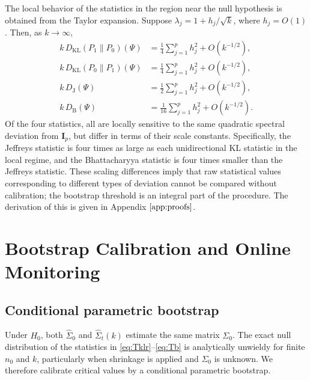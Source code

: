 \documentclass[11pt,a4paper]{article}
\newcommand{\I}{\mathbf{I}}
\newcommand{\KL}{\mathrm{KL}}
\newcommand{\J}{\mathrm{J}}
\newcommand{\Bhat}{\mathrm{B}}
\begin{document}
The local behavior of the statistics in the region near the null hypothesis is obtained from the Taylor
expansion. Suppose $\lambda_{j}=1+h_{j}/\sqrt{k}$, where $h_{j}=O(1)$. Then,
as $k\to\infty$,
\begin{align}
k\,D_{\KL}(P_{1}\|P_{0})(\Psi) &= \tfrac{1}{4}\textstyle\sum_{j=1}^{p} h_{j}^{2}+O(k^{-1/2}),
\label{eq:loc-klr}\\
k\,D_{\KL}(P_{0}\|P_{1})(\Psi) &= \tfrac{1}{4}\textstyle\sum_{j=1}^{p} h_{j}^{2}+O(k^{-1/2}),
\label{eq:loc-klf}\\
k\,D_{\J}(\Psi) &= \tfrac{1}{2}\textstyle\sum_{j=1}^{p} h_{j}^{2}+O(k^{-1/2}),
\label{eq:loc-j}\\
k\,D_{\Bhat}(\Psi) &= \tfrac{1}{16}\textstyle\sum_{j=1}^{p} h_{j}^{2}+O(k^{-1/2}).
\label{eq:loc-b}
\end{align}
Of the four statistics, all are locally sensitive to the same quadratic spectral
deviation from $\I_{p}$, but differ in terms of their scale constants.  Specifically,
the Jeffreys statistic is four times as large as each unidirectional KL statistic
in the local regime, and the Bhattacharyya statistic is four times smaller
than the Jeffreys statistic.  These scaling differences
imply that raw statistical values corresponding to different types of deviation
cannot be compared without calibration; the bootstrap threshold is an integral part of the procedure. The derivation
of this is given in Appendix $\ref{app:proofs}$.

\section{Bootstrap Calibration and Online Monitoring}
\label{sec:bootstrap}

\subsection{Conditional parametric bootstrap}

Under $H_{0}$, both $\widehat{\Sigma}_{0}$ and $\widehat{\Sigma}_{t}(k)$
estimate the same matrix $\Sigma_{0}$.  The exact null distribution of the
statistics in \eqref{eq:Tklr}--\eqref{eq:Tb} is analytically unwieldy for
finite $n_{0}$ and $k$, particularly when shrinkage is applied and $\Sigma_{0}$
is unknown.  We therefore calibrate critical values by a conditional parametric
bootstrap.
\end{document}
